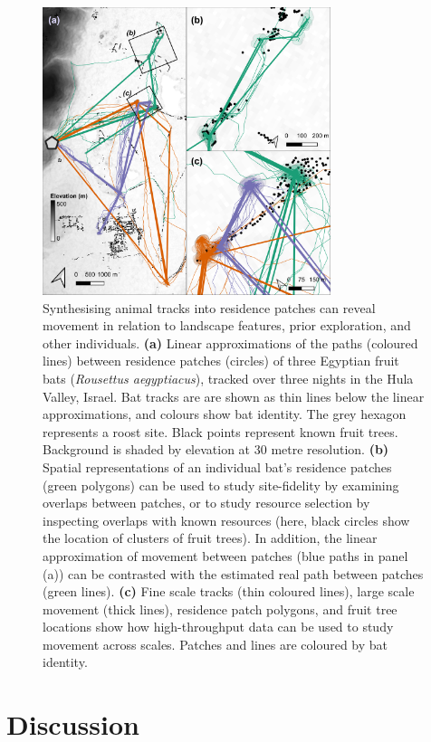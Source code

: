 \documentclass[10pt,paper=a4,headings=standardclasses
]{scrartcl}
\begin{document}
\begin{figure}[h!]
    \centering
    \includegraphics[width=0.75\textwidth]{figures/fig_07_bats.png}
    \caption{Synthesising animal tracks into residence patches can reveal movement in relation to landscape features, prior exploration, and other individuals.
    \textbf{(a)} Linear approximations of the paths (coloured lines) between residence patches (circles) of three Egyptian fruit bats (\textit{Rousettus aegyptiacus}), tracked over three nights in the Hula Valley, Israel.
    Bat tracks are are shown as thin lines below the linear approximations, and colours show bat identity. The grey hexagon represents a roost site.
    Black points represent known fruit trees.
    Background is shaded by elevation at 30 metre resolution.
    \textbf{(b)} Spatial representations of an individual bat's residence patches (green polygons) can be used to study site-fidelity by examining overlaps between patches, or to study resource selection by inspecting overlaps with known resources (here, black circles show the location of clusters of fruit trees).
    In addition, the linear approximation of movement between patches (blue paths in panel (a)) can be contrasted with the estimated real path between patches (green lines).
    \textbf{(c)} Fine scale tracks (thin coloured lines), large scale movement (thick lines), residence patch polygons, and fruit tree locations show how high-throughput data can be used to study movement across scales.
    Patches and lines are coloured by bat identity.}
    \label{fig:figure_bats}
\end{figure}

\section{Discussion}
\end{document}
